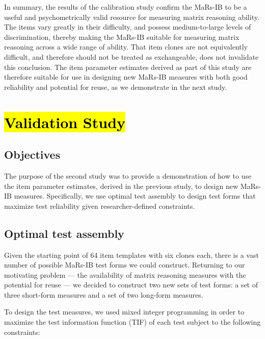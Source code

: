 \documentclass[a4paper,man,natbib]{apa6}
\begin{document}
In summary, the results of the calibration study confirm the MaRs-IB to be a useful and psychometrically valid resource for measuring matrix reasoning ability. The items vary greatly in their difficulty, and possess medium-to-large levels of discrimination, thereby making the MaRs-IB suitable for measuring matrix reasoning across a wide range of ability. That item clones are not equivalently difficult, and therefore should not be treated as exchangeable, does not invalidate this conclusion. The item parameter estimates derived as part of this study are therefore suitable for use in designing new MaRs-IB measures with both good reliability and potential for reuse, as we demonstrate in the next study. 

\section{\texorpdfstring{\hl{Validation Study}}{}}

\subsection{Objectives}

The purpose of the second study was to provide a demonstration of how to use the item parameter estimates, derived in the previous study, to design new MaRs-IB measures. Specifically, we use optimal test assembly \citep{van1998optimal} to design test forms that maximize test reliability given researcher-defined constraints. 

\subsection{Optimal test assembly}

Given the starting point of 64 item templates with six clones each, there is a vast number of possible MaRs-IB test forms we could construct. Returning to our motivating problem --- the availability of matrix reasoning measures with the potential for reuse --- we decided to construct two new sets of test forms: a set of three short-form measures and a set of two long-form measures. 

To design the test measures, we used mixed integer programming \citep{der2005wj} in order to maximize the test information function (TIF) of each test subject to the following constraints:
\end{document}
